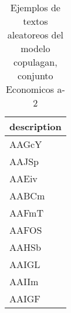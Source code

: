 \begin{table}[H]
\centering
\fontsize{8}{14}\selectfont
\caption{Ejemplos de textos aleatoreos del modelo copulagan, conjunto Economicos a-2}
\label{table-sample10-economicos-a-2-copulagan-text}
\begin{tabular}{|m{50em}|}
\hline
\rowcolor[gray]{0.8}
description \\
\hline AAGcY \\
\hline AAJSp \\
\hline AAEiv \\
\hline AABCm \\
\hline AAFmT \\
\hline AAFOS \\
\hline AAHSb \\
\hline AAIGL \\
\hline AAIIm \\
\hline AAIGF \\
\hline
\end{tabular}
\end{table}
